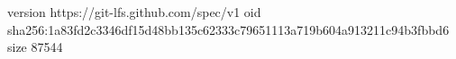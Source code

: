 version https://git-lfs.github.com/spec/v1
oid sha256:1a83fd2c3346df15d48bb135c62333c79651113a719b604a913211c94b3fbbd6
size 87544
